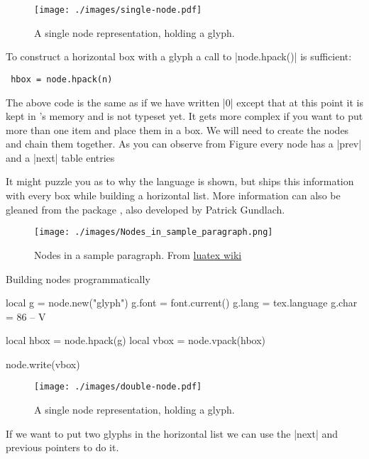\begin{figure}[ht]
\centering
\texttt{[image: ./images/single-node.pdf]}
\caption{A single node representation, holding a glyph.}
\end{figure}

To construct a horizontal box with a glyph a call to |node.hpack()| is sufficient:
\begin{verbatim}
 hbox = node.hpack(n)
\end{verbatim}

The above code is the same as if we have written |\hbox{0}| except that at this point it is kept in \tex's memory and is not typeset yet. It gets more complex if you want to put more than one item and place them in a box. We will need to create the nodes and chain them together. As you can observe from Figure every node has a |prev|  and a |next| table entries


It might puzzle you as to why the language is shown, but \tex ships this information with every box while building a horizontal list. More information can also be gleaned from the package , also developed by Patrick Gundlach. 

\begin{figure}[ht]
\centering
\texttt{[image: ./images/Nodes\_in\_sample\_paragraph.png]}
\caption{Nodes in a sample paragraph. From  \protect\href{http://wiki.luatex.org/images/Nodes_in_sample_paragraph.png}{luatex wiki}}
\end{figure}



\begin{texexample}{Building nodes programmatically}{}
\begin{luacode*}
   local g = node.new("glyph")
   g.font = font.current()
  g.lang = tex.language
  g.char = 86 -- V

  local hbox = node.hpack(g)
  local vbox = node.vpack(hbox)

  node.write(vbox)
\end{luacode*}
\end{texexample}

\begin{figure}[ht]
\centering
\texttt{[image: ./images/double-node.pdf]}
\caption{A single node representation, holding a glyph.}
\end{figure}


If we want to put two glyphs in the horizontal list we can use the |next| and previous pointers to do it.

